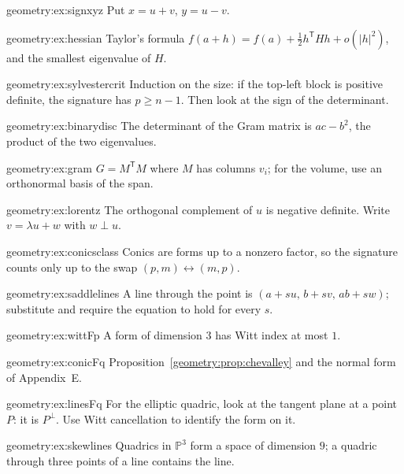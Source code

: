 \begin{hint}{geometry:ex:signxyz}
Put $x=u+v$, $y=u-v$.
\end{hint}
\begin{hint}{geometry:ex:hessian}
Taylor's formula $f(a+h)=f(a)+\frac12h^{\mathsf T}Hh+o(|h|^2)$, and the smallest eigenvalue of $H$.
\end{hint}
\begin{hint}{geometry:ex:sylvestercrit}
Induction on the size: if the top-left block is positive definite, the signature has $p\ge n-1$. Then look at the sign of the determinant.
\end{hint}
\begin{hint}{geometry:ex:binarydisc}
The determinant of the Gram matrix is $ac-b^2$, the product of the two eigenvalues.
\end{hint}
\begin{hint}{geometry:ex:gram}
$G=M^{\mathsf T}M$ where $M$ has columns $v_i$; for the volume, use an orthonormal basis of the span.
\end{hint}
\begin{hint}{geometry:ex:lorentz}
The orthogonal complement of $u$ is negative definite. Write $v=\lambda u+w$ with $w\perp u$.
\end{hint}
\begin{hint}{geometry:ex:conicsclass}
Conics are forms up to a nonzero factor, so the signature counts only up to the swap $(p,m)\leftrightarrow(m,p)$.
\end{hint}
\begin{hint}{geometry:ex:saddlelines}
A line through the point is $(a+su,\,b+sv,\,ab+sw)$; substitute and require the equation to hold for every $s$.
\end{hint}
\begin{hint}{geometry:ex:wittFp}
A form of dimension $3$ has Witt index at most $1$.
\end{hint}
\begin{hint}{geometry:ex:conicFq}
Proposition~\ref{geometry:prop:chevalley} and the normal form of Appendix~E.
\end{hint}
\begin{hint}{geometry:ex:linesFq}
For the elliptic quadric, look at the tangent plane at a point $P$: it is $P^\perp$. Use Witt cancellation to identify the form on it.
\end{hint}
\begin{hint}{geometry:ex:skewlines}
Quadrics in $\mathbb P^3$ form a space of dimension $9$; a quadric through three points of a line contains the line.
\end{hint}


